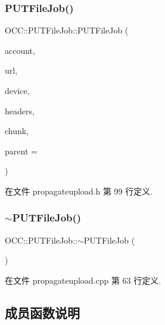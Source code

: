 \subsubsection{\texorpdfstring{P\+U\+T\+File\+Job()}{PUTFileJob()}\hspace{0.1cm}{\footnotesize\ttfamily [2/2]}}
{\footnotesize\ttfamily O\+C\+C\+::\+P\+U\+T\+File\+Job\+::\+P\+U\+T\+File\+Job (\begin{DoxyParamCaption}\item[{\hyperlink{namespace_o_c_c_a848616aedb9188e223c6b9867757fe69}{Account\+Ptr}}]{account,  }\item[{const Q\+Url \&}]{url,  }\item[{Q\+I\+O\+Device $\ast$}]{device,  }\item[{const Q\+Map$<$ Q\+Byte\+Array, Q\+Byte\+Array $>$ \&}]{headers,  }\item[{int}]{chunk,  }\item[{Q\+Object $\ast$}]{parent = {} }\end{DoxyParamCaption})\hspace{0.3cm}{\ttfamily [explicit]}}



在文件 propagateupload.\+h 第 99 行定义.

\mbox{\label{class_o_c_c_1_1_p_u_t_file_job_a1187329dcae74fc1a3231e15956b139c}} 
\subsubsection{\texorpdfstring{$\sim$\+P\+U\+T\+File\+Job()}{~PUTFileJob()}}
{\footnotesize\ttfamily O\+C\+C\+::\+P\+U\+T\+File\+Job\+::$\sim$\+P\+U\+T\+File\+Job (\begin{DoxyParamCaption}{ }\end{DoxyParamCaption})}



在文件 propagateupload.\+cpp 第 63 行定义.



\subsection{成员函数说明}
\mbox{\label{class_o_c_c_1_1_p_u_t_file_job_a35f718aea247b85f83a7761ce2e77195}} 
